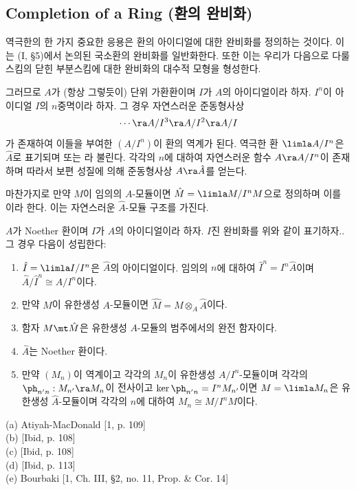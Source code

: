 	
	\subsection*{Completion of a Ring (환의 완비화)}
	
	역극한의 한 가지 중요한 응용은 환의 아이디얼에 대한 완비화를 정의하는 것이다.
	이는 (I, \S 5)에서 논의된 국소환의 완비화를 일반화한다.
	또한 이는 우리가 다음으로 다룰 스킴의 닫힌 부분스킴에 대한 완비화의 대수적 모형을 형성한다.
	
	그러므로 $A$가 (항상 그렇듯이) 단위 가환환이며 $I$가 $A$의 아이디얼이라 하자.
	$I^n$이 아이디얼 $I$의 $n$중멱이라 하자. 그 경우 자연스러운 준동형사상
	$$\cdots\ra A/I^3\ra A/I^2\ra A/I$$
	가 존재하여 이들을 부여한 $(A/I^n)$이 환의 역계가 된다.
	역극한 환 $\limla A/I^n$은 $\hat A$로 표기되며 
	또는 라 불린다.
	각각의 $n$에 대하여 자연스러운 함수 $A\ra A/I^n$이 존재하며 따라서 보편 성질에 의해 준동형사상 $A\ra\hat A$를 얻는다.
	
	마찬가지로 만약 $M$이 임의의 $A$-모듈이면 $\hat M=\limla M/I^nM$으로 정의하며
	이를 이라 한다. 이는 자연스러운 $\hat A$-모듈 구조를 가진다.
	
	
	\begin{theorema}
	$A$가 Noether 환이며 $I$가 $A$의 아이디얼이라 하자. $I$진 완비화를 위와 같이 표기하자.. 그 경우 다음이 성립한다:
	\begin{enumerate}[label=(\alph*)]
	\item $\hat I=\limla I/I^n$은 $\hat A$의 아이디얼이다. 임의의 $n$에 대하여 $\hat I^n=I^n\hat A$이며 $\hat A/\hat I^n\cong A/I^n$이다.
	\item 만약 $M$이 유한생성 $A$-모듈이면 $\hat M=M\otimes_A\hat A$이다.
	\item 함자 $M\mt\hat M$은 유한생성 $A$-모듈의 범주에서의 완전 함자이다.
	\item $\hat A$는 Noether 환이다.
	\item 만약 $(M_n)$이 역계이고 각각의 $M_n$이 유한생성 $A/I^n$-모듈이며 각각의 $\ph_{n'n}:M_{n'}\ra M_n$이 전사이고
	$\ker\ph_{n'n}=I^nM_{n'}$이면 $M=\limla M_n$은 유한생성 $\hat A$-모듈이며 각각의 $n$에 대하여 $M_n\cong M/I^nM$이다.\\
	\end{enumerate}
	\pf (a) Atiyah-MacDonald [1, p. 109]\\
	(b) [Ibid, p. 108]\\
	(c) [Ibid, p. 108]\\
	(d) [Ibid, p. 113]\\
	(e) Bourbaki [1, Ch. III, \S 2, no. 11, Prop. \& Cor. 14]
	\end{theorema}
	
